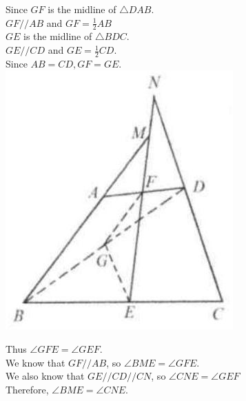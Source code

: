 \documentclass[10pt]{article}
\begin{document}
Since \(G F\) is the midline of \(\triangle D A B\).\\
\(G F / / A B\) and \(G F=\frac{1}{2} A B\)\\
\(G E\) is the midline of \(\triangle B D C\).\\
\(G E / / C D\) and \(G E=\frac{1}{2} C D\).\\
Since \(A B=C D, G F=G E\).\\
\includegraphics[max width=\textwidth, center]{2025_04_17_97bc1f7e44d93c271a88g-042}

Thus \(\angle G F E=\angle G E F\).\\
We know that \(G F / / A B\), so \(\angle B M E=\angle G F E\).\\
We also know that \(G E / / C D / / C N\), so \(\angle C N E=\angle G E F\)\\
Therefore, \(\angle B M E=\angle C N E\).
\end{document}
